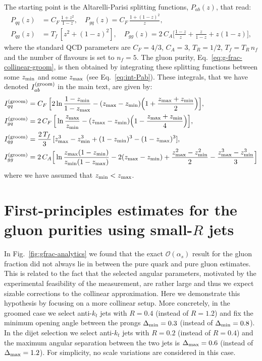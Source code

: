 \documentclass[a4paper,11pt]{article}
\newcommand{\zmin}{z_{\rm{min}}}
\newcommand{\zmax}{z_{\rm{max}}}
\begin{document}
The starting point is the Altarelli-Parisi splitting functions, $P_{ab}(z)$, that read:
\begin{align}
\label{eq:ap}
P_{qq}(z) & = C_F\,\frac{1+z^2}{1-z}, \quad P_{gq}(z) = C_F\,\frac{1+(1-z)^2}{z}, \nonumber \\
P_{qg}(z) & = T_f\,[z^2+(1-z)^2], \quad P_{gg}(z) = 2\,C_A\Big[\frac{1-z}{z} + \frac{z}{1-z} + z(1-z)\Big],
\end{align}
where the standard QCD parameters are $C_F=4/3$, $C_A=3$, $T_R=1/2$, $T_f=T_R\,n_f$ and the number of flavours is set to $n_f=5$.
The gluon purity, Eq.~\eqref{eq:g-frac-collinear-groom}, is then obtained by integrating these splitting functions between some $z_{\rm min}$ and some $z_{\rm max}$ (see Eq.~\eqref{eq:int-Pab}). These integrals, that we have denoted $I_{ab}^{\rm (groom)}$ in the main text, are given by:
\begin{align}
\label{eq:Iab}
I^{(\rm groom)}_{qq} & = C_F\,\Big[2\ln\frac{1-\zmin}{1-\zmax}-(\zmax-\zmin)\Big(1+\frac{\zmax+\zmin}{2}\Big)\Big],  \\
I^{(\rm groom)}_{gq} & = 2\,C_F\, \Big[\ln\frac{\zmax}{\zmin}-(\zmax-\zmin)\Big(1-\frac{\zmax+\zmin}{4}\Big)\Big],  \\
I^{(\rm groom)}_{qg} & = \frac{2\,T_f}{3} \,[\zmax^3-\zmin^3+(1-\zmin)^3-(1-\zmax)^3],\\ 
I^{(\rm groom)}_{gg} & = 2\,C_A \Big[\ln\frac{\zmax(1-\zmin)}{\zmin(1-\zmax)}-2(\zmax-\zmin) + \frac{\zmax^2-\zmin^2}{2} - \frac{\zmax^3-\zmin^3}{3}\Big]
\end{align}
where we have assumed that $z_{\rm min}<z_{\rm max}$.
\section{First-principles estimates for the gluon purities using small-$R$ jets}
\label{app:small-R}
In Fig.~\ref{fig:gfrac-analytics} we found that the exact $\mathcal{O}(\alpha_s)$ result for the gluon fraction did not always lie in between the pure quark and pure gluon estimates. This is related to the fact that the selected angular parameters, motivated by the experimental feasibility of the measurement, are rather large and thus we expect sizable corrections to the collinear approximation. Here we demonstrate this hypothesis by focusing on a more collinear setup. More concretely, in the groomed case we select anti-$k_t$ jets with $R=0.4$ (instead of $R=1.2$) and fix the minimum opening angle between the prongs $\Delta_{\rm min}=0.3$ (instead of $\Delta_{\rm min}=0.8$). In the dijet selection we select anti-$k_t$ jets with $R=0.2$ (instead of $R=0.4$) and the maximum angular separation between the two jets is $\Delta_{\rm max}=0.6$ (instead of $\Delta_{\rm max}=1.2$). For simplicity, no scale variations are considered in this case. 
\end{document}
